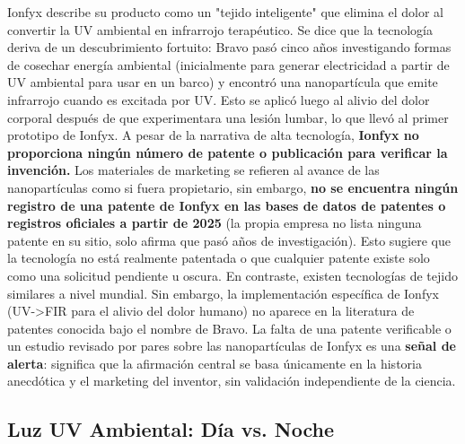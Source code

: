 \documentclass{article}
\begin{document}
Ionfyx describe su producto como un "tejido inteligente" que elimina el dolor al convertir la UV ambiental en infrarrojo terapéutico. Se dice que la tecnología deriva de un descubrimiento fortuito: Bravo pasó cinco años investigando formas de cosechar energía ambiental (inicialmente para generar electricidad a partir de UV ambiental para usar en un barco) y encontró una nanopartícula que emite infrarrojo cuando es excitada por UV. Esto se aplicó luego al alivio del dolor corporal después de que experimentara una lesión lumbar, lo que llevó al primer prototipo de Ionfyx. A pesar de la narrativa de alta tecnología, \textbf{Ionfyx no proporciona ningún número de patente o publicación para verificar la invención.} Los materiales de marketing se refieren al avance de las nanopartículas como si fuera propietario, sin embargo, \textbf{no se encuentra ningún registro de una patente de Ionfyx en las bases de datos de patentes o registros oficiales a partir de 2025} (la propia empresa no lista ninguna patente en su sitio, solo afirma que pasó años de investigación). Esto sugiere que la tecnología no está realmente patentada o que cualquier patente existe solo como una solicitud pendiente u oscura. En contraste, existen tecnologías de tejido similares a nivel mundial. Sin embargo, la implementación específica de Ionfyx (UV->FIR para el alivio del dolor humano) no aparece en la literatura de patentes conocida bajo el nombre de Bravo. La falta de una patente verificable o un estudio revisado por pares sobre las nanopartículas de Ionfyx es una \textbf{señal de alerta}: significa que la afirmación central se basa únicamente en la historia anecdótica y el marketing del inventor, sin validación independiente de la ciencia.

\subsection{Luz UV Ambiental: Día vs. Noche}
\end{document}
